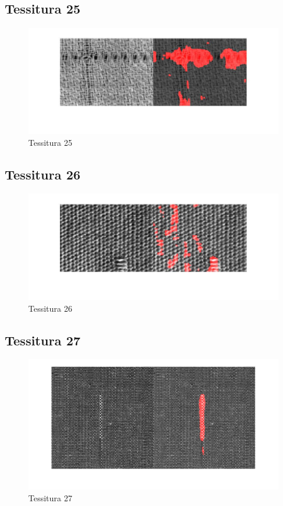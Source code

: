 \documentclass{article}
\begin{document}
\newpage

\subsection{Tessitura 25}

\begin{figure}[h!]
	\centering
	\includegraphics[width=\textwidth]{results/res25.jpg}
	\caption{Tessitura 25}
\end{figure}


\subsection{Tessitura 26}

\begin{figure}[h!]
	\centering
	\includegraphics[width=\textwidth]{results/res26.jpg}
	\caption{Tessitura 26}
\end{figure}

\newpage

\subsection{Tessitura 27}

\begin{figure}[h!]
	\centering
	\includegraphics[width=\textwidth]{results/res27.jpg}
	\caption{Tessitura 27}
\end{figure}
\end{document}
